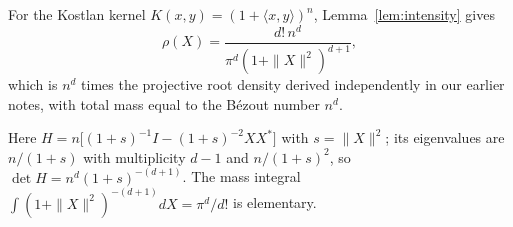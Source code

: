 \begin{proposition}\label{prop:kostlandensity}
  For the Kostlan kernel $K(x,y) = (1+\langle x,y\rangle)^n$, Lemma~\ref{lem:intensity} gives
  \[
    \rho(X) = \frac{d!\,n^d}{\pi^d(1+\|X\|^2)^{d+1}},
  \]
  which is $n^d$ times the projective root density derived independently in our earlier
  notes, with total mass equal to the B\'ezout number $n^d$.
\end{proposition}

\proof
Here $H = n\bigl[(1+s)^{-1}I - (1+s)^{-2}XX^*\bigr]$ with $s=\|X\|^2$; its eigenvalues are
$n/(1+s)$ with multiplicity $d-1$ and $n/(1+s)^2$, so $\det H = n^d(1+s)^{-(d+1)}$. The mass
integral $\int(1+\|X\|^2)^{-(d+1)}dX = \pi^d/d!$ is elementary.
\endproof
